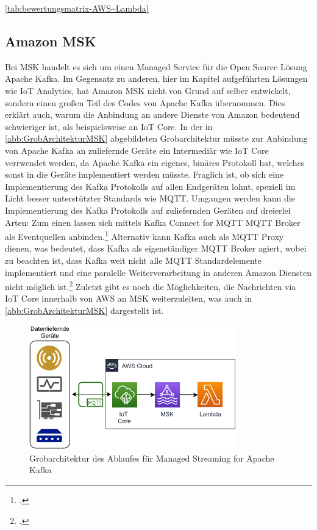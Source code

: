 \autoref{tab:bewertungsmatrix-AWS~Lambda}

\subsection{Amazon MSK}
Bei \ac{MSK} handelt es sich um einen Managed Service für die Open Source Lösung Apache Kafka. Im Gegensatz zu anderen, hier im Kapitel aufgeführten Lösungen wie \ac{IoT} Analytics, hat Amazon \ac{MSK} nicht von Grund auf selber entwickelt, sondern einen großen Teil des Codes von Apache Kafka übernommen. Dies erklärt auch, warum die Anbindung an andere Dienste von Amazon bedeutend schwieriger ist, als beispielsweise an \ac{IoT} Core. In der in \autoref{abb:GrobArchitekturMSK} abgebildeten Grobarchitektur müsste zur Anbindung von Apache Kafka an zuliefernde Geräte ein Intermediär wie \ac{IoT} Core verrwendet werden, da Apache Kafka ein eigenes, binäres Protokoll hat, welches sonst in die Geräte implementiert werden müsste.  Fraglich ist, ob sich eine Implementierung des Kafka Protokolls auf allen Endgeräten lohnt, speziell im Licht besser unterstützter Standards wie \ac{MQTT}. Umgangen werden kann die Implementierung des Kafka Protokolls auf zuliefernden Geräten auf dreierlei Arten: Zum einen lassen sich mittels Kafka Connect for \ac{MQTT} \ac{MQTT} Broker als Eventquellen anbinden.\footcite[Vgl.][]{Erber.12.01.2021} Alternativ kann Kafka auch als \ac{MQTT} Proxy dienen, was bedeutet, dass Kafka als eigenständiger MQTT Broker agiert, wobei zu beachten ist, dass Kafka weit nicht alle \ac{MQTT} Standardelemente implementiert und eine paralelle Weiterverarbeitung in anderen Amazon Diensten nicht möglich ist.\footcite[Vgl.][]{Erber.12.01.2021} Zuletzt gibt es noch die Möglichkeiten, die Nachrichten via \ac{IoT} Core innerhalb von \ac{AWS} an \ac{MSK} weiterzuleiten, was auch in \autoref{abb:GrobArchitekturMSK} dargestellt ist.
\begin{figure}[H]
\centering
\includegraphics[width=0.8\textwidth]{graphics/MSK-general.pdf}
\caption{Grobarchitektur des Ablaufes für Managed Streaming for Apache Kafka}
\label{abb:GrobArchitekturMSK}
\end{figure}

